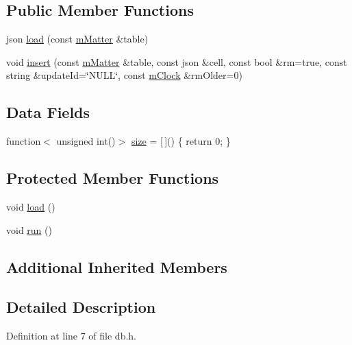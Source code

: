 \subsection*{Public Member Functions}
\begin{DoxyCompactItemize}
\item 
json \hyperlink{class_k_1_1_d_b_a069b992af5564be9a2a200e810cc3dfd}{load} (const \hyperlink{namespace_k_a06e0333f0bcd3fc79835735bb9cda73d}{m\+Matter} \&table)
\item 
void \hyperlink{class_k_1_1_d_b_ad83cbb93689eee240577ca5f9c8cec07}{insert} (const \hyperlink{namespace_k_a06e0333f0bcd3fc79835735bb9cda73d}{m\+Matter} \&table, const json \&cell, const bool \&rm=true, const string \&update\+Id=\char`\"{}N\+U\+LL\char`\"{}, const \hyperlink{km_8h_ad02a70cba4c52ba2013e5e32ceaeac1c}{m\+Clock} \&rm\+Older=0)
\end{DoxyCompactItemize}
\subsection*{Data Fields}
\begin{DoxyCompactItemize}
\item 
function$<$ unsigned int()$>$ \hyperlink{class_k_1_1_d_b_a0101f5929df54174b492135ea931b3dc}{size} = \mbox{[}$\,$\mbox{]}() \{ return 0; \}
\end{DoxyCompactItemize}
\subsection*{Protected Member Functions}
\begin{DoxyCompactItemize}
\item 
void \hyperlink{class_k_1_1_d_b_a78f61ac2dd03bcba8e09ca20cd7d68e3}{load} ()
\item 
void \hyperlink{class_k_1_1_d_b_a13a43e6d814de94978c515cb084873b1}{run} ()
\end{DoxyCompactItemize}
\subsection*{Additional Inherited Members}


\subsection{Detailed Description}


Definition at line 7 of file db.\+h.




